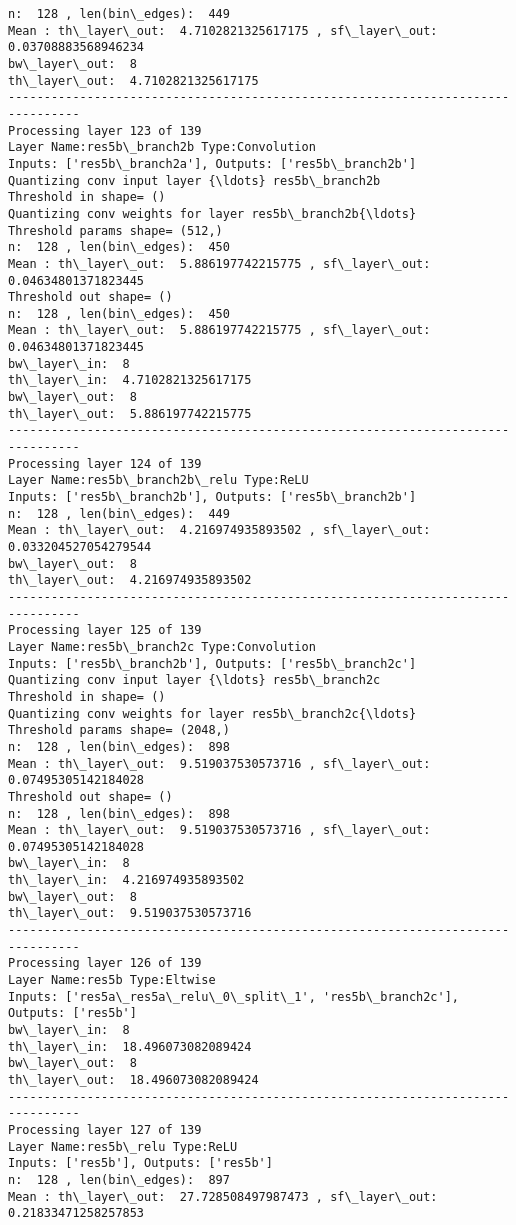 \documentclass[11pt]{article}
\begin{document}
\begin{Verbatim}[commandchars=\\\{\}]
n:  128 , len(bin\_edges):  449
Mean : th\_layer\_out:  4.7102821325617175 , sf\_layer\_out:  0.03708883568946234
bw\_layer\_out:  8
th\_layer\_out:  4.7102821325617175
--------------------------------------------------------------------------------
Processing layer 123 of 139
Layer Name:res5b\_branch2b Type:Convolution
Inputs: ['res5b\_branch2a'], Outputs: ['res5b\_branch2b']
Quantizing conv input layer {\ldots} res5b\_branch2b
Threshold in shape= ()
Quantizing conv weights for layer res5b\_branch2b{\ldots}
Threshold params shape= (512,)
n:  128 , len(bin\_edges):  450
Mean : th\_layer\_out:  5.886197742215775 , sf\_layer\_out:  0.04634801371823445
Threshold out shape= ()
n:  128 , len(bin\_edges):  450
Mean : th\_layer\_out:  5.886197742215775 , sf\_layer\_out:  0.04634801371823445
bw\_layer\_in:  8
th\_layer\_in:  4.7102821325617175
bw\_layer\_out:  8
th\_layer\_out:  5.886197742215775
--------------------------------------------------------------------------------
Processing layer 124 of 139
Layer Name:res5b\_branch2b\_relu Type:ReLU
Inputs: ['res5b\_branch2b'], Outputs: ['res5b\_branch2b']
n:  128 , len(bin\_edges):  449
Mean : th\_layer\_out:  4.216974935893502 , sf\_layer\_out:  0.033204527054279544
bw\_layer\_out:  8
th\_layer\_out:  4.216974935893502
--------------------------------------------------------------------------------
Processing layer 125 of 139
Layer Name:res5b\_branch2c Type:Convolution
Inputs: ['res5b\_branch2b'], Outputs: ['res5b\_branch2c']
Quantizing conv input layer {\ldots} res5b\_branch2c
Threshold in shape= ()
Quantizing conv weights for layer res5b\_branch2c{\ldots}
Threshold params shape= (2048,)
n:  128 , len(bin\_edges):  898
Mean : th\_layer\_out:  9.519037530573716 , sf\_layer\_out:  0.07495305142184028
Threshold out shape= ()
n:  128 , len(bin\_edges):  898
Mean : th\_layer\_out:  9.519037530573716 , sf\_layer\_out:  0.07495305142184028
bw\_layer\_in:  8
th\_layer\_in:  4.216974935893502
bw\_layer\_out:  8
th\_layer\_out:  9.519037530573716
--------------------------------------------------------------------------------
Processing layer 126 of 139
Layer Name:res5b Type:Eltwise
Inputs: ['res5a\_res5a\_relu\_0\_split\_1', 'res5b\_branch2c'], Outputs: ['res5b']
bw\_layer\_in:  8
th\_layer\_in:  18.496073082089424
bw\_layer\_out:  8
th\_layer\_out:  18.496073082089424
--------------------------------------------------------------------------------
Processing layer 127 of 139
Layer Name:res5b\_relu Type:ReLU
Inputs: ['res5b'], Outputs: ['res5b']
n:  128 , len(bin\_edges):  897
Mean : th\_layer\_out:  27.728508497987473 , sf\_layer\_out:  0.21833471258257853

\end{Verbatim}
\end{document}
